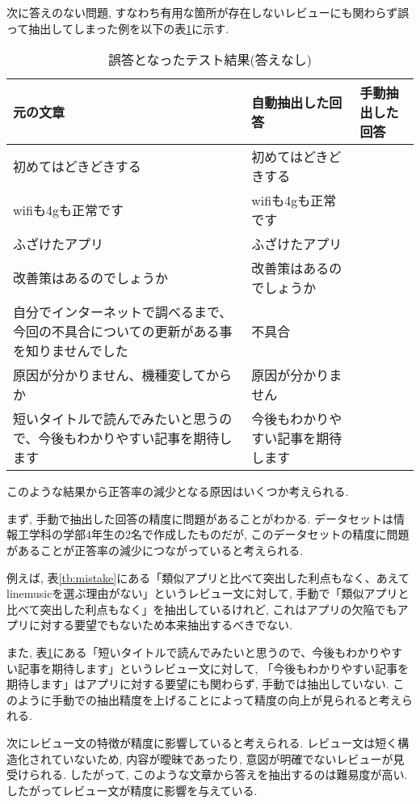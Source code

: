 次に答えのない問題, すなわち有用な箇所が存在しないレビューにも関わらず誤って抽出してしまった例を以下の表\ref{tb:mistake2}に示す.
\begin{table}[htbp]
  \caption{誤答となったテスト結果(答えなし)}
  \label{tb:mistake2}
  \begin{center}
  \begin{tabularx}{\linewidth}{|X|X|X|}
    \hline
    元の文章&自動抽出した回答&手動抽出した回答\\\hline\hline
    初めてはどきどきする&初めてはどきどきする&\\\hline
    wifiも4gも正常です&wifiも4gも正常です&\\\hline
    ふざけたアプリ&ふざけたアプリ&\\\hline
    改善策はあるのでしょうか&改善策はあるのでしょうか&\\\hline
    自分でインターネットで調べるまで、今回の不具合についての更新がある事を知りませんでした&不具合&\\\hline
    原因が分かりません、機種変してからか&原因が分かりません&\\\hline
    短いタイトルで読んでみたいと思うので、今後もわかりやすい記事を期待します&今後もわかりやすい記事を期待します&\\\hline
  \end{tabularx}\end{center}
\end{table}

このような結果から正答率の減少となる原因はいくつか考えられる. 

まず, 手動で抽出した回答の精度に問題があることがわかる. データセットは情報工学科の学部4年生の2名で作成したものだが, このデータセットの精度に問題があることが正答率の減少につながっていると考えられる. 

例えば, 表\ref{tb:mistake}にある「類似アプリと比べて突出した利点もなく、あえてlinemusicを選ぶ理由がない」というレビュー文に対して, 手動で「類似アプリと比べて突出した利点もなく」を抽出しているけれど, これはアプリの欠陥でもアプリに対する要望でもないため本来抽出するべきでない. 

また, 表\ref{tb:mistake2}にある「短いタイトルで読んでみたいと思うので、今後もわかりやすい記事を期待します」というレビュー文に対して, 「今後もわかりやすい記事を期待します」はアプリに対する要望にも関わらず, 手動では抽出していない. このように手動での抽出精度を上げることによって精度の向上が見られると考えられる. 

次にレビュー文の特徴が精度に影響していると考えられる. レビュー文は短く構造化されていないため, 内容が曖昧であったり, 意図が明確でないレビューが見受けられる. したがって, このような文章から答えを抽出するのは難易度が高い. したがってレビュー文が精度に影響を与えている. 

